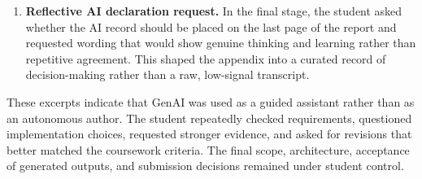 \documentclass[11pt,a4paper]{article}
\begin{document}
\begin{enumerate}[leftmargin=*]
    \item \textbf{Reflective AI declaration request.} In the final stage, the student asked whether the AI record should be placed on the last page of the report and requested wording that would show genuine thinking and learning rather than repetitive agreement. This shaped the appendix into a curated record of decision-making rather than a raw, low-signal transcript.
\end{enumerate}

\normalsize
These excerpts indicate that GenAI was used as a guided assistant rather than as an autonomous author. The student repeatedly checked requirements, questioned implementation choices, requested stronger evidence, and asked for revisions that better matched the coursework criteria. The final scope, architecture, acceptance of generated outputs, and submission decisions remained under student control.
\end{document}
